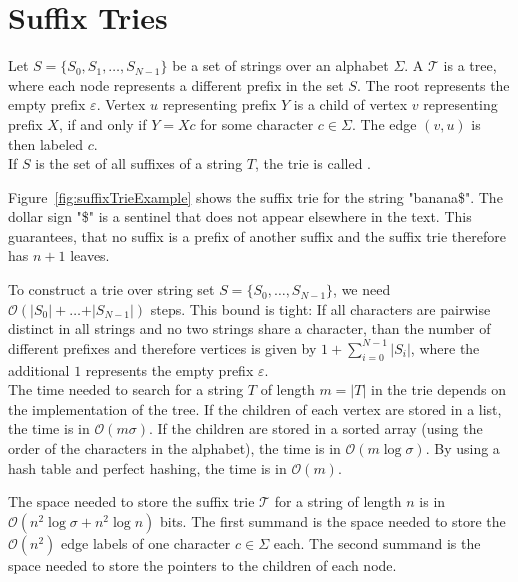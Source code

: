 \section{Suffix Tries}

\begin{Definition}
  Let $S = \{S_0, S_1, \ldots, S_{N-1}\}$ be a set of strings over an alphabet $\Sigma$. A  $\mathcal{T}$ is a tree, where each node represents a different prefix in the set $S$. The root represents the empty prefix $\varepsilon$. Vertex $u$ representing prefix $Y$ is a child of vertex $v$ representing prefix $X$, if and only if $Y = Xc$ for some character $c \in \Sigma$. The edge $(v,u)$ is then labeled $c$.\\
  If $S$ is the set of all suffixes of a string $T$, the trie is called .
\end{Definition}

\begin{Example}
  Figure~\ref{fig:suffixTrieExample} shows the suffix trie for the string "banana\$". The dollar sign "\$" is a sentinel that does not appear elsewhere in the text. This guarantees, that no suffix is a prefix of another suffix and the suffix trie therefore has $n+1$ leaves.
\end{Example}

To construct a trie over string set $S = \{S_0, \ldots, S_{N-1}\}$, we need $\mathcal{O}(\vert S_0 \vert + \ldots + \vert S_{N-1} \vert)$ steps. This bound is tight: If all characters are pairwise distinct in all strings and no two strings share a character, than the number of different prefixes and therefore vertices is given by $1 + \sum_{i=0}^{N-1} \vert S_i \vert$, where the additional $1$ represents the empty prefix $\varepsilon$.\\
The time needed to search for a string $T$ of length $m = \vert T \vert$ in the trie depends on the implementation of the tree. If the children of each vertex are stored in a list, the time is in $\mathcal{O}(m\sigma)$. If the children are stored in a sorted array (using the order of the characters in the alphabet), the time is in $\mathcal{O}(m\log \sigma)$. By using a hash table and perfect hashing, the time is in $\mathcal{O}(m)$.

The space needed to store the suffix trie $\mathcal{T}$ for a string of length $n$ is in $\mathcal{O}{(n^2\log \sigma + n^2\log n)}$ bits. The first summand is the space needed to store the $\mathcal{O}(n^2)$ edge labels of one character $c \in \Sigma$ each. The second summand is the space needed to store the pointers to the children of each node.

